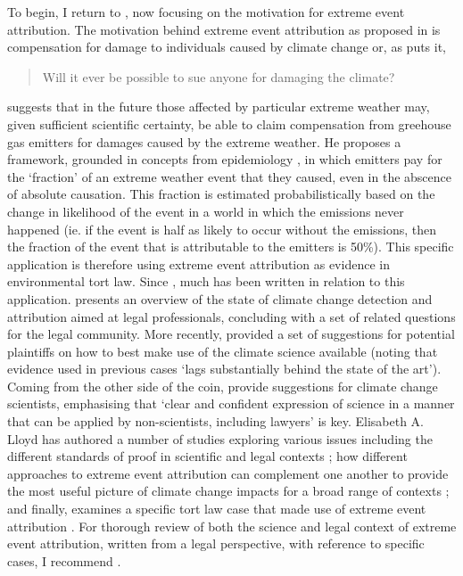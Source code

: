   To begin, I return to  \citep{allen_liability_2003}, now focusing on the motivation for extreme event attribution. The motivation behind extreme event attribution as proposed in  is compensation for damage to individuals caused by climate change or, as \citeauthor{allen_liability_2003} puts it, 
  \begin{quote}
    Will it ever be possible to sue anyone for damaging the climate?
  \end{quote}
  \citeauthor{allen_liability_2003} suggests that in the future those affected by particular extreme weather may, given sufficient scientific certainty, be able to claim compensation from greehouse gas emitters for damages caused by the extreme weather. He proposes a framework, grounded in concepts from epidemiology \citep{stone_end--end_2005}, in which emitters pay for the `fraction' of an extreme weather event that they caused, even in the abscence of absolute causation. This fraction is estimated probabilistically based on the change in likelihood of the event in a world in which the emissions never happened (ie. if the event is half as likely to occur without the emissions, then the fraction of the event that is attributable to the emitters is 50\%).
  This specific application is therefore using extreme event attribution as evidence in environmental tort law. Since \citet{allen_liability_2003}, much has been written in relation to this application. \citet{allen_scientific_2007} presents an overview of the state of climate change detection and attribution aimed at legal professionals, concluding with a set of related questions for the legal community. More recently, \citet{stuart-smith_filling_2021} provided a set of suggestions for potential plaintiffs on how to best make use of the climate science available (noting that evidence used in previous cases `lags substantially behind the state of the art'). Coming from the other side of the coin, \citet{marjanac_acts_2017} provide suggestions for climate change scientists, emphasising that `clear and confident expression of science in a manner that can be applied by non-scientists, including lawyers' is key. Elisabeth A. Lloyd has authored a number of studies exploring various issues including the different standards of proof in scientific and legal contexts \citep{lloyd_climate_2021}; how different approaches to extreme event attribution can complement one another to provide the most useful picture of climate change impacts for a broad range of contexts \citep{lloyd_climate_2018,lloyd_environmental_2020}; and finally, examines a specific tort law case that made use of extreme event attribution \citep{lloyd_climate_2021-1}. For thorough review of both the science and legal context of extreme event attribution, written from a legal perspective, with reference to specific cases, I recommend \citet{burger_law_2020,marjanac_extreme_2018}.
  
